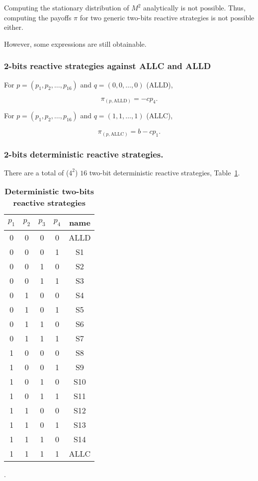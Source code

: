 \documentclass{article}
\begin{document}
Computing the stationary distribution of \(M^{2}\) analytically is not possible.
Thus, computing the payoffs \(\pi\) for two generic two-bits reactive strategies
is not possible either.

However, some expressions are still obtainable.

\subsubsection{2-bits reactive strategies against ALLC and ALLD}

For \(p = (p_1, p_2, \dots, p_{16})\) and \(q=(0, 0, \dots, 0)\) (ALLD),

\[\pi_{(p, \text{ALLD})} = - c p_4.\]

For \(p = (p_1, p_2, \dots, p_{16})\) and \(q=(1, 1, \dots, 1)\) (ALLC),

\[\pi_{(p, \text{ALLC})} = b - cp_1.\]
 

\subsubsection{2-bits deterministic reactive strategies.}

There are a total of (\(4 ^ 2\)) \(16\) two-bit deterministic reactive
strategies, Table~\ref{table:two_bits_strategies}.

\begin{table}[h!]
  \centering
   \begin{tabular}{c c c c c}
  \toprule
   $p_1$ & $p_2$ & $p_3$ & $p_4$ & name \\ [0.5ex] 
   \toprule
   0 & 0 & 0 & 0 & ALLD \\
   0 & 0 & 0 & 1 & S1 \\
   0 & 0 & 1 & 0 & S2 \\
   0 & 0 & 1 & 1 & S3 \\
   0 & 1 & 0 & 0 & S4 \\
   0 & 1 & 0 & 1 & S5 \\
   0 & 1 & 1 & 0 & S6 \\
   0 & 1 & 1 & 1 & S7 \\
   1 & 0 & 0 & 0 & S8 \\
   1 & 0 & 0 & 1 & S9 \\
   1 & 0 & 1 & 0 & S10 \\
   1 & 0 & 1 & 1 & S11 \\
   1 & 1 & 0 & 0 & S12 \\
   1 & 1 & 0 & 1 & S13 \\
   1 & 1 & 1 & 0 & S14 \\
   1 & 1 & 1 & 1 & ALLC \\
   \hline
   \end{tabular}
   \caption{\textbf{Deterministic two-bits reactive strategies}}\label{table:two_bits_strategies}.
\end{table}
\end{document}
